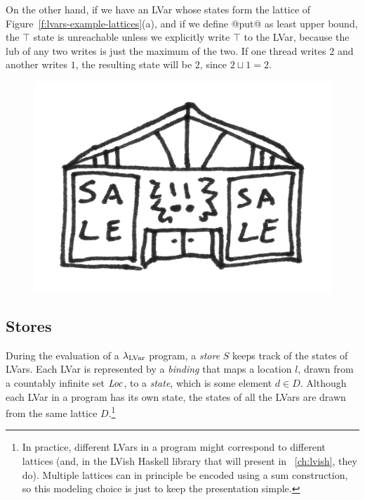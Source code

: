 On the other hand, if we have an LVar whose states form the lattice of
Figure~\ref{f:lvars-example-lattices}(a), and if we define @put@ as
least upper bound, the $\top$ state is unreachable unless we
explicitly write $\top$ to the LVar, because the lub of any two writes
is just the maximum of the two.  If one thread writes $2$ and another
writes $1$, the resulting state will be $2$, since $2 \sqcup 1 = 2$.

\ifdefined\DISSERTATION
\begin{figure}
\vspace{-2em}
\begin{center}
  \includegraphics[scale=0.15]{../illustrations/store}
\end{center}
\vspace{-2em}
\end{figure}
\fi

\subsection{Stores}\label{subsection:lvars-stores}

During the evaluation of a $\lambda_{\textrm{LVar}}$ program, a \emph{store} $S$
keeps track of the states of LVars.  Each LVar is represented by a
\emph{binding} that maps a location $l$, drawn from a countably infinite
set $\mathit{Loc}$, to a \emph{state}, which is some element $d \in D$.
Although each LVar in a program has its own state, the states of all
the LVars are drawn from the same lattice $D$.\footnote{In practice,
  different LVars in a program might correspond to different lattices (and,
  in the LVish Haskell library that  will present in
  ~\ref{ch:lvish}, they do).  Multiple lattices can in
  principle be encoded using a sum construction, so this modeling
  choice is just to keep the presentation simple.}

